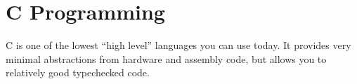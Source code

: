 \section{C Programming}\label{sec:C_Programming}
C is one of the lowest ``high level'' languages you can use today.
It provides very minimal abstractions from hardware and assembly code, but allows you to relatively good typechecked code.



